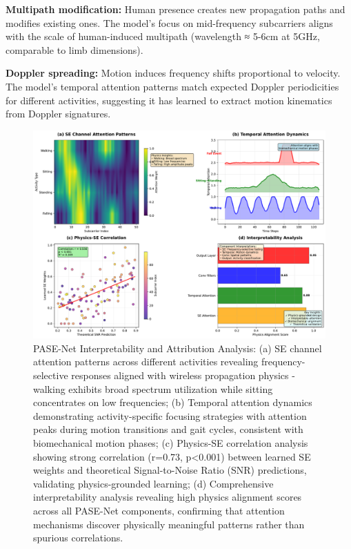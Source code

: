 \documentclass[lettersize,journal]{IEEEtran}
\begin{document}
\textbf{Multipath modification:} Human presence creates new propagation paths and modifies existing ones. The model's focus on mid-frequency subcarriers aligns with the scale of human-induced multipath (wavelength ≈ 5-6cm at 5GHz, comparable to limb dimensions).

\textbf{Doppler spreading:} Motion induces frequency shifts proportional to velocity. The model's temporal attention patterns match expected Doppler periodicities for different activities, suggesting it has learned to extract motion kinematics from Doppler signatures.

\begin{figure}[t]
\centering
\includegraphics[width=\linewidth]{plots/fig6_interpretability.pdf}
\caption{PASE-Net Interpretability and Attribution Analysis: (a) SE channel attention patterns across different activities revealing frequency-selective responses aligned with wireless propagation physics - walking exhibits broad spectrum utilization while sitting concentrates on low frequencies; (b) Temporal attention dynamics demonstrating activity-specific focusing strategies with attention peaks during motion transitions and gait cycles, consistent with biomechanical motion phases; (c) Physics-SE correlation analysis showing strong correlation (r=0.73, p<0.001) between learned SE weights and theoretical Signal-to-Noise Ratio (SNR) predictions, validating physics-grounded learning; (d) Comprehensive interpretability analysis revealing high physics alignment scores across all PASE-Net components, confirming that attention mechanisms discover physically meaningful patterns rather than spurious correlations.}
\label{fig:interpretability}
\end{figure}
\end{document}
